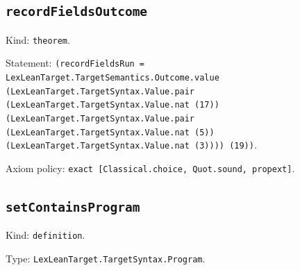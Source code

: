 \documentclass[11pt]{article}
\begin{document}
\subsection*{\texttt{recordFieldsOutcome}}
\noindent Kind: \texttt{theorem}.\par
\noindent Statement: \texttt{(recordFieldsRun = LexLeanTarget.TargetSemantics.Outcome.value (LexLeanTarget.TargetSyntax.Value.pair (LexLeanTarget.TargetSyntax.Value.nat (17)) (LexLeanTarget.TargetSyntax.Value.pair (LexLeanTarget.TargetSyntax.Value.nat (5)) (LexLeanTarget.TargetSyntax.Value.nat (3)))) (19))}.\par
\noindent Axiom policy: \texttt{exact [Classical.choice, Quot.sound, propext]}.\par
\subsection*{\texttt{setContainsProgram}}
\noindent Kind: \texttt{definition}.\par
\noindent Type: \texttt{LexLeanTarget.TargetSyntax.Program}.\par
\end{document}
